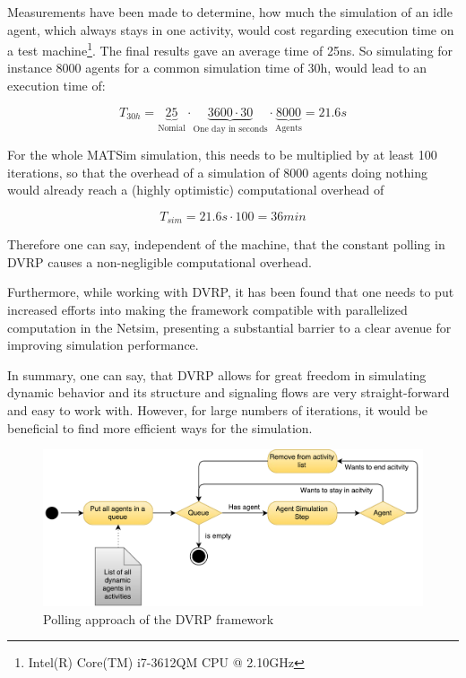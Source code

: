 Measurements have been made to determine, how much the simulation of an idle agent,
which always stays in one activity, would cost regarding execution time
on a test machine\footnote{Intel(R) Core(TM) i7-3612QM CPU @ 2.10GHz}. The final results
gave an average time of 25ns. So simulating for instance 8000 agents for a common
simulation time of 30h, would lead to an execution time of:

\begin{equation}
T_{30h} = \underbrace{25}_{\text{Nomial}} \cdot \underbrace{3600 \cdot 30}_{\text{One day in seconds}} \cdot \underbrace{8000}_{\text{Agents}} = 21.6s
\end{equation}

For the whole MATSim simulation, this needs to be multiplied by at least 100 iterations,
so that the overhead of a simulation of 8000 agents doing nothing would already
reach a (highly optimistic) computational overhead of

\begin{equation}
T_{sim} = 21.6s \cdot 100 = 36min
\end{equation}

Therefore one can say, independent of the machine, that the constant polling in
DVRP causes a non-negligible computational overhead.

Furthermore, while working with DVRP, it has been found that one needs to put
increased efforts into making the framework compatible with parallelized computation
in the Netsim, presenting a substantial barrier to a clear avenue for improving
simulation performance.

In summary, one can say, that DVRP allows for great freedom in simulating
dynamic behavior and its structure and signaling flows are very straight-forward
and easy to work with. However, for large numbers of iterations, it would
be beneficial to find more efficient ways for the simulation.

\begin{figure}
    \centering
    \includegraphics[width=1.0\textwidth]{figures/polling.pdf}
    \caption{Polling approach of the DVRP framework}
    \label{fig:polling}
\end{figure}


